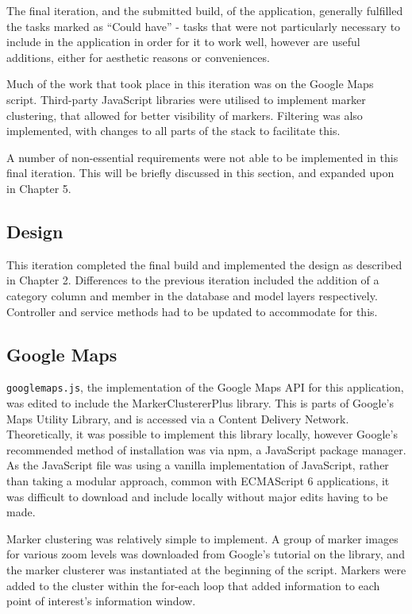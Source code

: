 The final iteration, and the submitted build, of the application, generally fulfilled the tasks marked as ``Could have'' - tasks that were not particularly necessary to include in the application in order for it to work well, however are useful additions, either for aesthetic reasons or conveniences.

Much of the work that took place in this iteration was on the Google Maps script. Third-party JavaScript libraries were utilised to implement marker clustering, that allowed for better visibility of markers. Filtering was also implemented, with changes to all parts of the stack to facilitate this.

A number of non-essential requirements were not able to be implemented in this final iteration. This will be briefly discussed in this section, and expanded upon in Chapter 5.

\subsection{Design}

This iteration completed the final build and implemented the design as described in Chapter 2. Differences to the previous iteration included the addition of a category column and member in the database and model layers respectively. Controller and service methods had to be updated to accommodate for this.

\subsection{Google Maps}

\texttt{googlemaps.js}, the implementation of the Google Maps API for this application, was edited to include the MarkerClustererPlus library. This is parts of Google's Maps Utility Library, and is accessed via a Content Delivery Network. Theoretically, it was possible to implement this library locally, however Google's recommended method of installation was via npm, a JavaScript package manager. As the JavaScript file was using a vanilla implementation of JavaScript, rather than taking a modular approach, common with ECMAScript 6 applications, it was difficult to download and include locally without major edits having to be made.

Marker clustering was relatively simple to implement. A group of marker images for various zoom levels was downloaded from Google's tutorial on the library, and the marker clusterer was instantiated at the beginning of the script. Markers were added to the cluster within the for-each loop that added information to each point of interest's information window.

